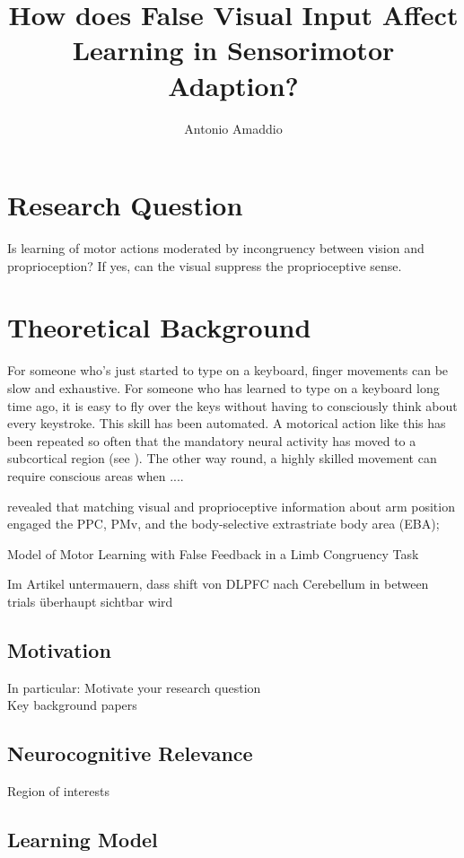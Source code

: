 \documentclass[man]{apa7}
\title{How does False Visual Input Affect Learning in Sensorimotor Adaption?}
\author{Antonio Amaddio}
\affiliation{Freie Universität Berlin \\ Decision Neuroscience, Winter 2022/23, Supervisor: Dr. Rasmus Bruckner}
\begin{document}
\maketitle

\tableofcontents

\section{Research Question}

Is learning of motor actions moderated by incongruency between vision and proprioception? If yes, can the visual suppress the proprioceptive sense.

\section{Theoretical Background}

For someone who's just started to type on a keyboard, finger movements can be slow and exhaustive. For someone who has learned to type on a keyboard long time ago, it is easy to fly over the keys without having to consciously think about every keystroke. This skill has been automated. A motorical action like this has been repeated so often that the mandatory neural activity has moved to a subcortical region (see \cite{seidler2013motor}). The other way round, a highly skilled movement can require conscious areas when ....

revealed that matching visual and proprioceptive information about arm position engaged the PPC, PMv, and the body-selective extrastriate body area (EBA);

Model of Motor Learning with False Feedback in a Limb Congruency Task

Im Artikel untermauern, dass shift von DLPFC nach Cerebellum in between trials überhaupt sichtbar wird

\subsection{Motivation}
In particular: Motivate your research question \\
Key background papers
\cite{Limanowski2016}
\cite{seidler2013motor}
\subsection{Neurocognitive Relevance}
Region of interests
\subsection{Learning Model}
\end{document}
